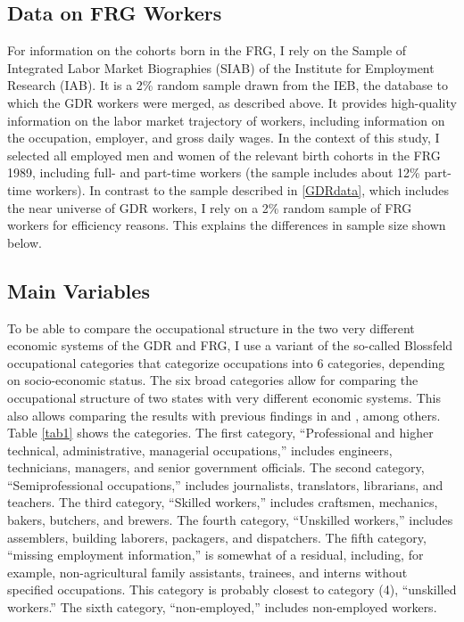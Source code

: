 \begin{Article}
\begin{refsection}[Spitz]
\subsection{Data on FRG Workers}
For information on the cohorts born in the FRG, I rely on the Sample of Integrated Labor Market Biographies (SIAB) of the Institute for Employment Research (IAB). It is a 2\% random sample drawn from the IEB, the database to which the GDR workers were merged, as described above. It provides high-quality information on the labor market trajectory of workers, including information on the occupation, employer, and gross daily wages. In the context of this study, I selected all employed men and women of the relevant birth cohorts in the FRG 1989, including full- and part-time workers (the sample includes about 12\% part-time workers). In contrast to the sample described in \ref{GDRdata}, which includes the near universe of GDR workers, I rely on a 2\% random sample of FRG workers for efficiency reasons. This explains the differences in sample size shown below. 

\subsection{Main Variables}

To be able to compare the occupational structure in the two very different economic systems of the GDR and FRG, I use a variant of the so-called Blossfeld occupational categories that categorize occupations into 6 categories, depending on socio-economic status. The six broad categories allow for comparing the occupational structure of two states with very different economic systems. This also allows comparing the results with previous findings in \cite{MayerSolga1994} and \cite{HuininkSolga1994}, among others. Table \ref{tab1} shows the categories. The first category, ``Professional and higher technical, administrative, managerial occupations,'' includes engineers, technicians, managers, and senior government officials. The second category, ``Semiprofessional occupations,'' includes journalists, translators, librarians, and teachers. The third category, ``Skilled workers,'' includes craftsmen, mechanics, bakers, butchers, and brewers. The fourth category, ``Unskilled workers,'' includes assemblers, building laborers, packagers, and dispatchers. The fifth category, ``missing employment information,'' is somewhat of a residual, including, for example, non-agricultural family assistants, trainees, and interns without specified occupations. This category is probably closest to category (4), ``unskilled workers.'' The sixth category, ``non-employed,'' includes non-employed workers.


\end{refsection}
\end{Article}
